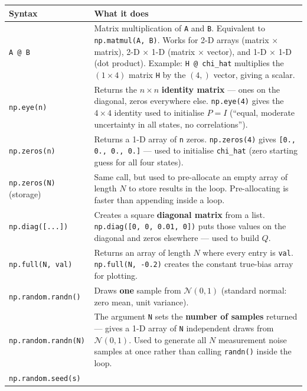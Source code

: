 \documentclass[12pt, a4paper]{article}
\begin{document}
\begin{center}
\renewcommand{\arraystretch}{1.6}
\begin{tabular}{p{4.5cm} p{9.0cm}}
  \toprule
  \textbf{Syntax} & \textbf{What it does} \\
  \midrule
  \texttt{A @ B}
    & Matrix multiplication of \texttt{A} and \texttt{B}.
      Equivalent to \texttt{np.matmul(A, B)}.
      Works for 2-D arrays (matrix $\times$ matrix),
      2-D $\times$ 1-D (matrix $\times$ vector), and
      1-D $\times$ 1-D (dot product).
      Example: \texttt{H @ chi\_hat} multiplies the
      $(1\times4)$ matrix \texttt{H} by the $(4,)$ vector,
      giving a scalar. \\
  \texttt{np.eye(n)}
    & Returns the $n \times n$ \textbf{identity matrix} ---
      ones on the diagonal, zeros everywhere else.
      \texttt{np.eye(4)} gives the $4\times4$ identity used to
      initialise $P = I$ (``equal, moderate uncertainty in all
      states, no correlations''). \\
  \texttt{np.zeros(n)}
    & Returns a 1-D array of \texttt{n} zeros.
      \texttt{np.zeros(4)} gives \texttt{[0., 0., 0., 0.]} ---
      used to initialise \texttt{chi\_hat} (zero starting guess
      for all four states). \\
  \texttt{np.zeros(N)} (storage)
    & Same call, but used to pre-allocate an empty array of
      length $N$ to store results in the loop.
      Pre-allocating is faster than appending inside a loop. \\
  \texttt{np.diag([...])}
    & Creates a square \textbf{diagonal matrix} from a list.
      \texttt{np.diag([0, 0, 0.01, 0])} puts those values on
      the diagonal and zeros elsewhere --- used to build $Q$. \\
  \texttt{np.full(N, val)}
    & Returns an array of length $N$ where every entry is
      \texttt{val}.
      \texttt{np.full(N, -0.2)} creates the constant true-bias
      array for plotting. \\
  \texttt{np.random.randn()}
    & Draws \textbf{one} sample from $\mathcal{N}(0,1)$
      (standard normal: zero mean, unit variance). \\
  \texttt{np.random.randn(N)}
    & The argument \texttt{N} sets the \textbf{number of samples}
      returned --- gives a 1-D array of \texttt{N} independent
      draws from $\mathcal{N}(0,1)$.
      Used to generate all $N$ measurement noise samples at once
      rather than calling \texttt{randn()} inside the loop. \\
  \texttt{np.random.seed(s)}

\end{tabular}
\end{center}
\end{document}
